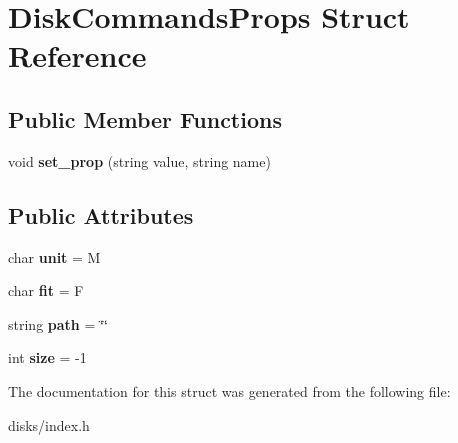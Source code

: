 \hypertarget{structDiskCommandsProps}{}\section{Disk\+Commands\+Props Struct Reference}
\label{structDiskCommandsProps}
\subsection*{Public Member Functions}
\begin{DoxyCompactItemize}
\item 
\mbox{\label{structDiskCommandsProps_ab747ea0dd5ac4b327a12fee7474f4723}} 
void {\bfseries set\+\_\+prop} (string value, string name)
\end{DoxyCompactItemize}
\subsection*{Public Attributes}
\begin{DoxyCompactItemize}
\item 
\mbox{\label{structDiskCommandsProps_ad81ed25cc8e07974a918fe78f4849da6}} 
char {\bfseries unit} = \textquotesingle{}M\textquotesingle{}
\item 
\mbox{\label{structDiskCommandsProps_af12962b744838d683f7b8025c0aac8a5}} 
char {\bfseries fit} = \textquotesingle{}F\textquotesingle{}
\item 
\mbox{\label{structDiskCommandsProps_adc6e22a84d4d91b937d7ba60934fcf5f}} 
string {\bfseries path} = \char`\"{}\char`\"{}
\item 
\mbox{\label{structDiskCommandsProps_adfa30ea70cf9fddd5731e54444d633e6}} 
int {\bfseries size} = -\/1
\end{DoxyCompactItemize}


The documentation for this struct was generated from the following file\+:\begin{DoxyCompactItemize}
\item 
disks/index.\+h\end{DoxyCompactItemize}
